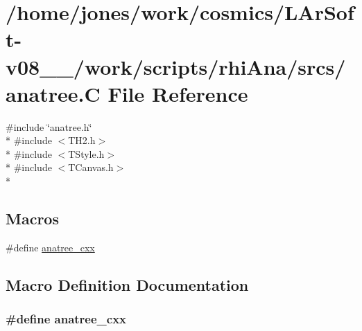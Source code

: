 \hypertarget{anatree_8C}{\section{/home/jones/work/cosmics/\-L\-Ar\-Soft-\/v08\-\_\-\_/work/scripts/rhi\-Ana/srcs/anatree.C File Reference}
\label{anatree_8C}
}
{\ttfamily \#include \char`\"{}anatree.\-h\char`\"{}}\\*
{\ttfamily \#include $<$T\-H2.\-h$>$}\\*
{\ttfamily \#include $<$T\-Style.\-h$>$}\\*
{\ttfamily \#include $<$T\-Canvas.\-h$>$}\\*
\subsection*{Macros}
\begin{DoxyCompactItemize}
\item 
\#define \hyperlink{anatree_8C_a87bcc6658704419d6bf92d8cd31edacc}{anatree\-\_\-cxx}
\end{DoxyCompactItemize}


\subsection{Macro Definition Documentation}
\hypertarget{anatree_8C_a87bcc6658704419d6bf92d8cd31edacc}{
\subsubsection[{anatree\-\_\-cxx}]{\setlength{\rightskip}{0pt plus 5cm}\#define anatree\-\_\-cxx}}\label{anatree_8C_a87bcc6658704419d6bf92d8cd31edacc}

